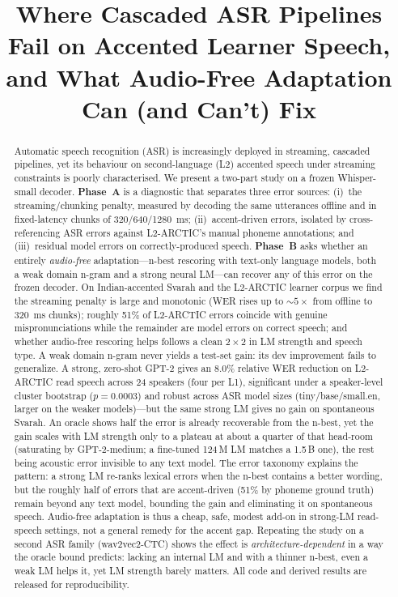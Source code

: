 \documentclass[conference]{IEEEtran}
\begin{document}
\title{Where Cascaded ASR Pipelines Fail on Accented Learner Speech, and What Audio-Free Adaptation Can (and Can't) Fix}
\author{
}
\maketitle

\begin{abstract}
Automatic speech recognition (ASR) is increasingly deployed in streaming, cascaded pipelines, yet its behaviour on second-language (L2) accented speech under streaming constraints is poorly characterised. We present a two-part study on a frozen Whisper-small decoder. \textbf{Phase~A} is a diagnostic that separates three error sources: (i)~the streaming/chunking penalty, measured by decoding the same utterances offline and in fixed-latency chunks of 320/640/1280~ms; (ii)~accent-driven errors, isolated by cross-referencing ASR errors against L2-ARCTIC's manual phoneme annotations; and (iii)~residual model errors on correctly-produced speech. \textbf{Phase~B} asks whether an entirely \emph{audio-free} adaptation---n-best rescoring with text-only language models, both a weak domain n-gram and a strong neural LM---can recover any of this error on the frozen decoder. On Indian-accented Svarah and the L2-ARCTIC learner corpus we find the streaming penalty is large and monotonic (WER rises up to $\sim5\times$ from offline to 320~ms chunks); roughly 51\% of L2-ARCTIC errors coincide with genuine mispronunciations while the remainder are model errors on correct speech; and whether audio-free rescoring helps follows a clean $2\times2$ in LM strength and speech type. A weak domain n-gram never yields a test-set gain: its dev improvement fails to generalize. A strong, zero-shot GPT-2 gives an 8.0\% relative WER reduction on L2-ARCTIC read speech across 24 speakers (four per L1), significant under a speaker-level cluster bootstrap ($p=0.0003$) and robust across ASR model sizes (tiny/base/small.en, larger on the weaker models)---but the same strong LM gives no gain on spontaneous Svarah. An oracle shows half the error is already recoverable from the n-best, yet the gain scales with LM strength only to a plateau at about a quarter of that head-room (saturating by GPT-2-medium; a fine-tuned 124\,M LM matches a 1.5\,B one), the rest being acoustic error invisible to any text model. The error taxonomy explains the pattern: a strong LM re-ranks lexical errors when the n-best contains a better wording, but the roughly half of errors that are accent-driven (51\% by phoneme ground truth) remain beyond any text model, bounding the gain and eliminating it on spontaneous speech. Audio-free adaptation is thus a cheap, safe, modest add-on in strong-LM read-speech settings, not a general remedy for the accent gap. Repeating the study on a second ASR family (wav2vec2-CTC) shows the effect is \emph{architecture-dependent} in a way the oracle bound predicts: lacking an internal LM and with a thinner n-best, even a weak LM helps it, yet LM strength barely matters. All code and derived results are released for reproducibility.

\end{abstract}
\end{document}
